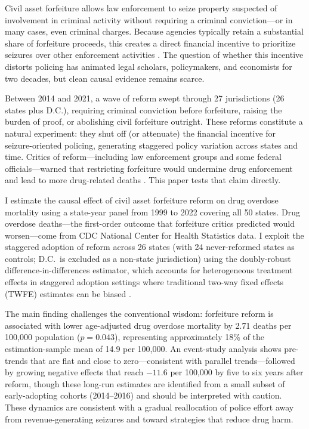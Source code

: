 \documentclass[12pt]{article}
\begin{document}
Civil asset forfeiture allows law enforcement to seize property suspected of involvement in criminal activity without requiring a criminal conviction---or in many cases, even criminal charges. Because agencies typically retain a substantial share of forfeiture proceeds, this creates a direct financial incentive to prioritize seizures over other enforcement activities \citep{worrall2001addicted, carpenter2011civil}. The question of whether this incentive distorts policing has animated legal scholars, policymakers, and economists for two decades, but clean causal evidence remains scarce.

Between 2014 and 2021, a wave of reform swept through 27 jurisdictions (26 states plus D.C.), requiring criminal conviction before forfeiture, raising the burden of proof, or abolishing civil forfeiture outright. These reforms constitute a natural experiment: they shut off (or attenuate) the financial incentive for seizure-oriented policing, generating staggered policy variation across states and time. Critics of reform---including law enforcement groups and some federal officials---warned that restricting forfeiture would undermine drug enforcement and lead to more drug-related deaths \citep{rubin2015equitable}. This paper tests that claim directly.

I estimate the causal effect of civil asset forfeiture reform on drug overdose mortality using a state-year panel from 1999 to 2022 covering all 50 states. Drug overdose deaths---the first-order outcome that forfeiture critics predicted would worsen---come from CDC National Center for Health Statistics data. I exploit the staggered adoption of reform across 26 states (with 24 never-reformed states as controls; D.C.\ is excluded as a non-state jurisdiction) using the \citet{callaway2021difference} doubly-robust difference-in-differences estimator, which accounts for heterogeneous treatment effects in staggered adoption settings where traditional two-way fixed effects (TWFE) estimates can be biased \citep{goodman2021difference}.

The main finding challenges the conventional wisdom: forfeiture reform is associated with lower age-adjusted drug overdose mortality by 2.71 deaths per 100,000 population ($p = 0.043$), representing approximately 18\% of the estimation-sample mean of 14.9 per 100,000. An event-study analysis shows pre-trends that are flat and close to zero---consistent with parallel trends---followed by growing negative effects that reach $-11.6$ per 100,000 by five to six years after reform, though these long-run estimates are identified from a small subset of early-adopting cohorts (2014--2016) and should be interpreted with caution. These dynamics are consistent with a gradual reallocation of police effort away from revenue-generating seizures and toward strategies that reduce drug harm.
\end{document}
